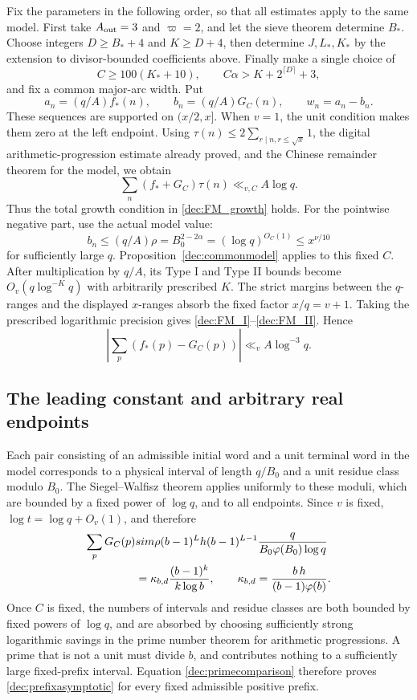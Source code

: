 \documentclass[11pt,a4paper]{article}
\theoremstyle{paperplain}
\numberwithin{equation}{section}
\begin{document}
Fix the parameters in the following order, so that all estimates
apply to the same model.
First take $A_{\rm out}=3$ and $\varpi=2$, and let the sieve theorem
determine $B_*$. Choose integers $D\ge B_*+4$ and $K\ge D+4$,
then determine $J,L_*,K_*$ by the extension to divisor-bounded
coefficients above. Finally make a single choice of
\[
 C\ge100(K_*+10),\qquad C\alpha>K+2^{\lceil D\rceil}+3,
\]
and fix a common major-arc width. Put
\[
 a_n=(q/A)f_*(n),\qquad b_n=(q/A)G_C(n),\qquad w_n=a_n-b_n.
\]
These sequences are supported on $(x/2,x]$.
When $v=1$, the unit condition makes them zero at the left endpoint.
Using $\tau(n)\le2\sum_{r\mid n,r\le\sqrt x}1$, the digital
arithmetic-progression estimate already proved, and the Chinese
remainder theorem for the model, we obtain
\[
 \sum_n(f_*+G_C)\tau(n)\ll_{v,C}A\log q.
\]
Thus the total growth condition in \eqref{dec:FM_growth} holds.
For the pointwise negative part, use the actual model value:
\[
 b_n\le(q/A)\rho=B_0^{2-2\alpha}=(\log q)^{O_C(1)}\le x^{\nu/10}
\]
for sufficiently large $q$.
Proposition~\ref{dec:commonmodel} applies to this fixed $C$.
After multiplication by $q/A$, its Type I and Type II bounds become
$O_v(q\log^{-K}q)$ with arbitrarily prescribed $K$.
The strict margins between the $q$-ranges and the displayed $x$-ranges
absorb the fixed factor $x/q=v+1$.
Taking the prescribed logarithmic precision gives
\eqref{dec:FM_I}--\eqref{dec:FM_II}. Hence
\begin{equation}\label{dec:primecomparison}
 \left|\sum_p(f_*(p)-G_C(p))\right|\ll_vA\log^{-3}q.
\end{equation}

\subsection{The leading constant and arbitrary real endpoints}
\label{dec:endpoints}

Each pair consisting of an admissible initial word and a unit terminal
word in the model corresponds to a physical interval of length $q/B_0$
and a unit residue class modulo $B_0$.
The Siegel--Walfisz theorem applies uniformly to these moduli, which are
bounded by a fixed power of $\log q$, and to all endpoints.
Since $v$ is fixed, $\log t=\log q+O_v(1)$, and therefore
\begin{align}
 \sum_pG_C(p)
 &\sim\rho(b-1)^Lh(b-1)^{L-1}
       \frac{q}{B_0\varphi(B_0)\log q}\notag\\
 &=\kappa_{b,d}\frac{(b-1)^k}{k\log b},\qquad
 \kappa_{b,d}=\frac{b\,h}{(b-1)\varphi(b)}.
 \label{dec:prefixasymptotic}
\end{align}
Once $C$ is fixed, the numbers of intervals and residue classes are
both bounded by fixed powers of $\log q$, and are absorbed by choosing
sufficiently strong logarithmic savings in the prime number theorem
for arithmetic progressions.
A prime that is not a unit must divide $b$, and contributes nothing
to a sufficiently large fixed-prefix interval.
Equation \eqref{dec:primecomparison} therefore proves
\eqref{dec:prefixasymptotic} for every fixed admissible positive prefix.
\end{document}
